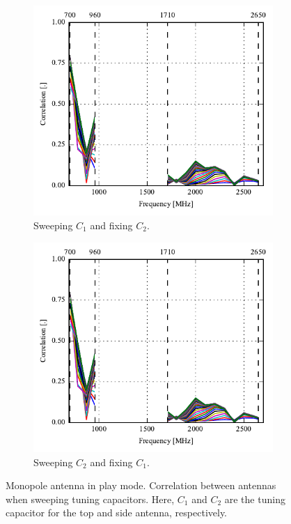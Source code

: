 \begin{figure}[htbp]
    \centering
    \begin{subfigure}{0.49\linewidth}
        \includegraphics{img/tech_sol/monopole/highband/ue/playmode/corr_top.pdf}
        \caption{Sweeping $C_1$ and fixing $C_2$.}
    \end{subfigure}
    \hfill
    \begin{subfigure}{0.49\linewidth}
        \includegraphics{img/tech_sol/monopole/highband/ue/playmode/corr_top.pdf}
        \caption{Sweeping $C_2$ and fixing $C_1$.}
    \end{subfigure}
    \caption{Monopole antenna in play mode. Correlation between antennas when sweeping tuning capacitors. Here, $C_1$ and $C_2$ are the tuning capacitor for the top and side antenna, respectively.}
    \label{fig:corr_mono_modi_play_mode}
\end{figure}

